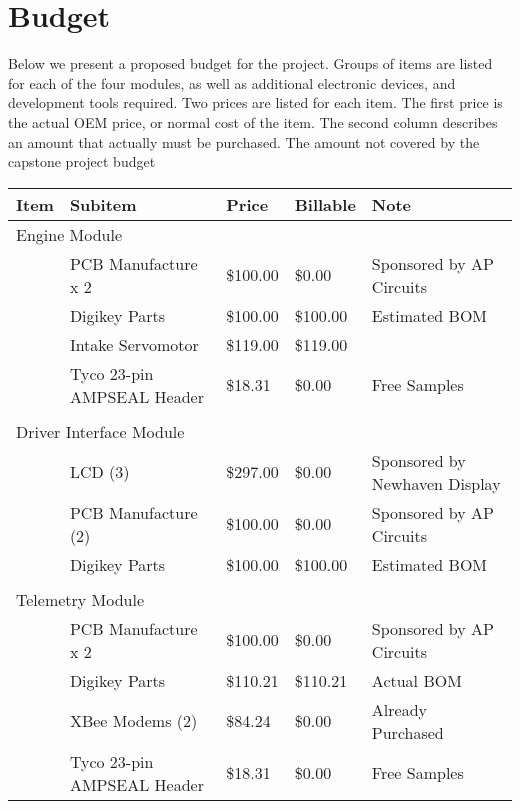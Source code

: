 %
%
%
%

\chapter{Budget}

Below we present a proposed budget for the project. Groups of items are listed for each of the four modules, as well as additional electronic devices, and development tools required. Two prices are listed for each item. The first price is the actual OEM price, or normal cost of the item. The second column describes an amount that actually must be purchased. The amount not covered by the capstone project budget 

\centering
\begin{scriptsize}
  \begin{tabular}{|l|>{\raggedright}p{}|l|l|>{\raggedright}p{}|}
    \hline 
    Item & Subitem & Price & Billable & Note\tabularnewline
    \hline
    \hline 
    \multicolumn{2}{|l|}{Engine Module} &  &  & \tabularnewline
    \hline 
    & PCB Manufacture x 2 & \$100.00 & \$0.00 & Sponsored by AP Circuits\tabularnewline
    \hline 
    & Digikey Parts & \$100.00 & \$100.00 & Estimated BOM\tabularnewline
    \hline 
    & Intake Servomotor & \$119.00 & \$119.00 & \tabularnewline
    \hline 
    & Tyco 23-pin AMPSEAL Header & \$18.31 & \$0.00 & Free Samples\tabularnewline
    \hline 
    \multicolumn{1}{|l}{} & \multicolumn{1}{>{\raggedright}p{0.35\columnwidth}}{} & \multicolumn{1}{l}{} & \multicolumn{1}{l}{} & \tabularnewline
    \hline 
    \multicolumn{2}{|l|}{Driver Interface Module} &  &  & \tabularnewline
    \hline 
    & LCD (3) & \$297.00 & \$0.00 & Sponsored by Newhaven Display\tabularnewline
    \hline 
    & PCB Manufacture (2) & \$100.00 & \$0.00 & Sponsored by AP Circuits\tabularnewline
    \hline 
    & Digikey Parts & \$100.00 & \$100.00 & Estimated BOM\tabularnewline
    \hline 
    \multicolumn{1}{|l}{} & \multicolumn{1}{>{\raggedright}p{0.35\columnwidth}}{} & \multicolumn{1}{l}{} & \multicolumn{1}{l}{} & \tabularnewline
    \hline 
    \multicolumn{2}{|l|}{Telemetry Module} &  &  & \tabularnewline
    \hline 
    & PCB Manufacture x 2 & \$100.00 & \$0.00 & Sponsored by AP Circuits\tabularnewline
    \hline 
    & Digikey Parts & \$110.21 & \$110.21 & Actual BOM\tabularnewline
    \hline 
    & XBee Modems (2) & \$84.24 & \$0.00 & Already Purchased\tabularnewline
    \hline 
    & Tyco 23-pin AMPSEAL Header & \$18.31 & \$0.00 & Free Samples\tabularnewline

\end{tabular}
\end{scriptsize}
